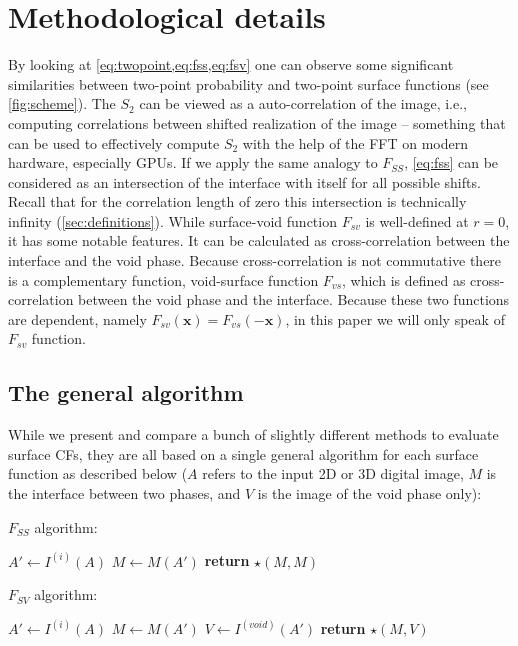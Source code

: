 \documentclass[reprint,amsmath,amssymb,aps,pre,showkeys,showpacs]{revtex4-1}
\begin{document}
\section{Methodological details}
\label{sec:details}
By looking at \cref{eq:twopoint,eq:fss,eq:fsv} one can observe
some significant similarities between two-point probability and two-point
surface functions (see \cref{fig:scheme}). The $S_2$ can be viewed as a
auto-correlation of the image, i.e., computing correlations between shifted
realization of the image -- something that can be used to effectively compute
$S_2$ with the help of the FFT on modern hardware, especially GPUs. If we apply
the same analogy to $F_{SS}$, \cref{eq:fss} can be considered as an intersection
of the interface with itself for all possible shifts. Recall that for the
correlation length of zero this intersection is technically infinity
(\cref{sec:definitions}). While surface-void function $F_{sv}$ is well-defined
at $r=0$, it has some notable features. It can be calculated as
cross-correlation between the interface and the void phase. Because
cross-correlation is not commutative there is a complementary function,
void-surface function $F_{vs}$, which is defined as cross-correlation between
the void phase and the interface. Because these two functions are dependent,
namely $F_{sv}(\mathbf{x}) = F_{vs}(-\mathbf{x})$, in this paper we will only
speak of $F_{sv}$ function.

\subsection{The general algorithm}
\label{sec:general}
While we present and compare a bunch of slightly different methods to evaluate
surface CFs, they are all based on a single general algorithm for each surface
function as described below ($A$ refers to the input 2D or 3D digital image, $M$
is the interface between two phases, and $V$ is the image of the void phase
only):

$F_{SS}$ algorithm:
\begin{algorithmic}[1]
  \State $A' \gets I^{(i)}(A)$
  \State $M \gets M(A')$
  \State \textbf{return} $\star(M, M)$
  \EndProcedure
\end{algorithmic}

$F_{SV}$ algorithm:
\begin{algorithmic}[1]
  \State $A' \gets I^{(i)}(A)$
  \State $M \gets M(A')$
  \State $V \gets I^{(void)}(A')$
  \State \textbf{return} $\star(M, V)$
  \EndProcedure
\end{algorithmic}
\end{document}
